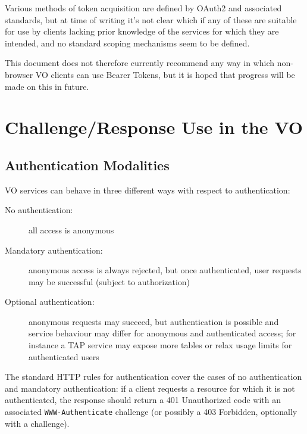 \documentclass[11pt,a4paper]{ivoa}
\newcommand{\header}[1]{{\tt #1}}
\begin{document}
Various methods of token acquisition are defined by OAuth2 and
associated standards, but at time of writing it's not clear which if
any of these are suitable for use by clients lacking prior knowledge
of the services for which they are intended,
and no standard scoping mechanisms seem to be defined.

This document does not therefore currently recommend any way in
which non-browser VO clients can use Bearer Tokens,
but it is hoped that progress will be made on this in future.



\section{Challenge/Response Use in the VO}
\label{sec:cr-use}

\subsection{Authentication Modalities}
\label{sec:modalities}

VO services can behave in three different ways with respect to authentication:
\begin{description}
  \item[No authentication:]
       all access is anonymous
  \item[Mandatory authentication:]
       anonymous access is always rejected, but once authenticated,
       user requests may be successful (subject to authorization)
  \item[Optional authentication:]
       anonymous requests may succeed, but authentication is possible
       and service behaviour may differ for anonymous and authenticated access;
       for instance a TAP service may expose more tables or relax
       usage limits for authenticated users
\end{description}

The standard HTTP rules for authentication cover the cases of
no authentication and mandatory authentication:
if a client requests a resource for which it is not authenticated,
the response should return a 401 Unauthorized code with an associated
\header{WWW-Authenticate} challenge
(or possibly a 403 Forbidden, optionally with a challenge).
\end{document}
